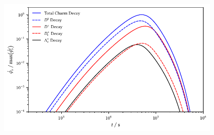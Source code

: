 \begin{figure}[H]
	\centering
	\includegraphics{../plots/build/magnetar_charm_decay_comparison_without.pdf}
	\caption[Magnetar $\nu \kern+0.5pt$ flux from $c$ decay excluding optical depth.]
			{}
	\label{fig:magnetar-charm-comparison-without}
\end{figure}
